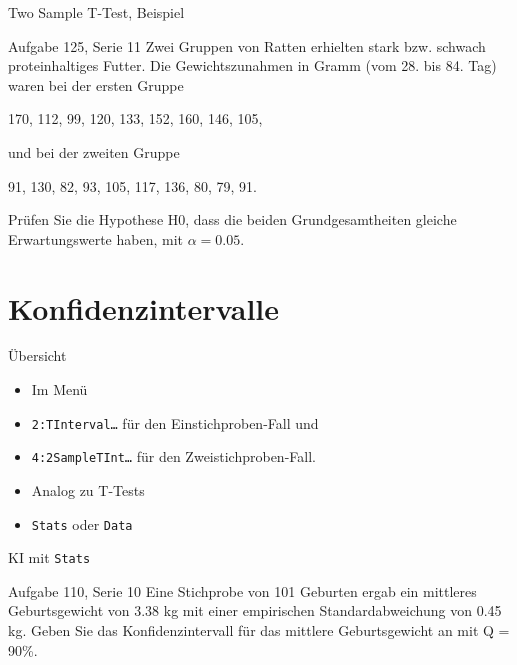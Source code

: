 \documentclass[handout]{beamer}
\newlength{\tikey}
\newcommand{\keystroke}[1]{\settowidth{\tikey}{\scriptsize #1}\psframebox[framearc=0.2]{\parbox{\tikey}{\scriptsize #1}}}
\begin{document}
\begin{frame}{Two Sample T-Test, Beispiel}
\begin{beamerboxesrounded}[shadow]{Aufgabe 125, Serie 11}
Zwei Gruppen von Ratten erhielten stark bzw. schwach proteinhaltiges Futter.
Die Gewichtszunahmen in Gramm (vom 28. bis 84. Tag) waren bei der ersten Gruppe
\begin{center}
170, 112, 99, 120, 133, 152, 160, 146, 105,
\end{center}
und bei der zweiten Gruppe
\begin{center}
91, 130, 82, 93, 105, 117, 136, 80, 79, 91.
\end{center}

Prüfen Sie die Hypothese H0, dass die beiden Grundgesamtheiten gleiche
Erwartungswerte haben, mit $\alpha = 0.05$.
\end{beamerboxesrounded}
\end{frame}

\section[KI]{Konfidenzintervalle}
\begin{frame}{Übersicht}
\begin{itemize}
\item Im Menü \keystroke{F7}
\item \texttt{2:TInterval\ldots} für den Einstichproben-Fall und
\item \texttt{4:2SampleTInt\ldots} für den Zweistichproben-Fall.
\item Analog zu T-Tests
\item \texttt{Stats} oder \texttt{Data}
\end{itemize}
\end{frame}

\begin{frame}{KI mit \texttt{Stats}}
\begin{beamerboxesrounded}[shadow]{Aufgabe 110, Serie 10}
Eine Stichprobe von 101 Geburten ergab ein mittleres Geburtsgewicht von 3.38 kg
mit einer empirischen Standardabweichung von 0.45 kg. Geben Sie das
Konfidenzintervall für das mittlere Geburtsgewicht an mit Q = 90\%.
\end{beamerboxesrounded}
\end{frame}
\end{document}
